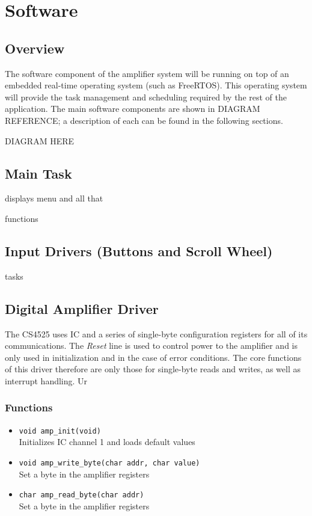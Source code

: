 \chapter{Software}

\section{Overview}

The software component of the amplifier system will be running on top of an embedded real-time operating system (such as FreeRTOS). This operating system will provide the task management and scheduling required by the rest of the application. The main software components are shown in DIAGRAM REFERENCE; a description of each can be found in the following sections.

DIAGRAM HERE

\section{Main Task}

displays menu and all that

functions

\section{Input Drivers (Buttons and Scroll Wheel)}

tasks

\section{Digital Amplifier Driver}
The CS4525 uses IC and a series of single-byte configuration registers for all of its communications. The \emph{Reset} line is used to control power to the amplifier and is only used in initialization and in the case of error conditions. The core functions of this driver therefore are only those for single-byte reads and writes, as well as interrupt handling. Ur

\subsection*{Functions}
\begin{itemize}
\item \texttt{void amp\_init(void)} \\ Initializes IC channel 1 and loads default values
\item \texttt{void amp\_write\_byte(char addr, char value)} \\ Set a byte in the amplifier registers
\item \texttt{char amp\_read\_byte(char addr)} \\ Set a byte in the amplifier registers
\end{itemize}

